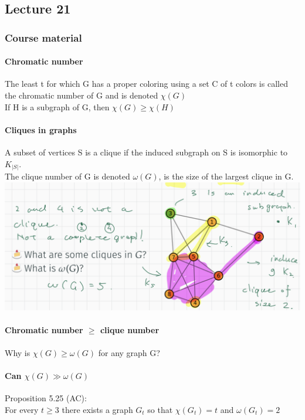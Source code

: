\documentclass{article}
\begin{document}
\subsection{Lecture 21}
\subsubsection{Course material}
\paragraph{Chromatic number}
The least t for which G has a proper coloring using a set C of t colors is called the chromatic number of G and is denoted $\chi(G)$\\
If H is a subgraph of G, then $\chi (G) \ge \chi (H) $\newline
\paragraph{Cliques in graphs}
A subset of vertices S is a clique if the induced subgraph on S is isomorphic to $K_{|S|}$.\\
The clique number of G is denoted $\omega (G)$, is the size of the
largest clique in G.\\
\includegraphics{0093}
\paragraph{Chromatic number $\ge$ clique number}
Why is $\chi(G)\ge \omega(G)$ for any graph G?
\paragraph{Can $\chi (G) \gg \omega (G)$}
Proposition 5.25 (AC):\\
For every $t\ge 3$ there exists a graph $G_t$ so that $\chi(G_t)=t$ and $\omega (G_t)=2$
\end{document}
